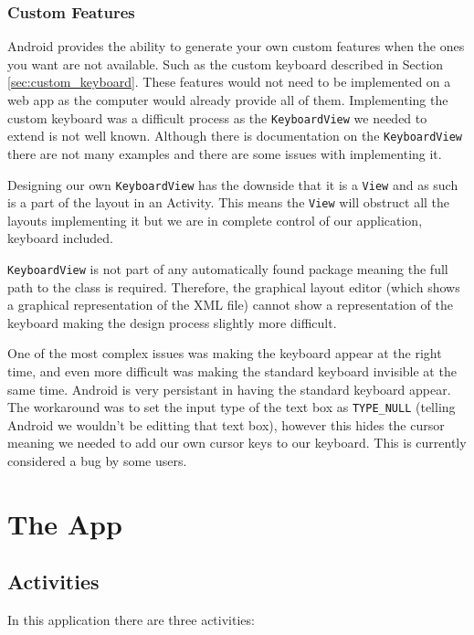\documentclass[draft]{report}
\begin{document}
\subsection{Custom Features}
\label{sub:custom_features}

Android provides the ability to generate your own custom features when the ones you want are not available. Such as the custom keyboard described in Section \ref{sec:custom_keyboard}. These features would not need to be implemented on a web app as the computer would already provide all of them. Implementing the custom keyboard was a difficult process as the {\tt KeyboardView} we needed to extend is not well known. Although there is documentation on the {\tt KeyboardView} there are not many examples and there are some issues with implementing it.

Designing our own {\tt KeyboardView} has the downside that it is a {\tt View} and as such is a part of the layout in an Activity. This means the {\tt View} will obstruct all the layouts implementing it but we are in complete control of our application, keyboard included.

{\tt KeyboardView} is not part of any automatically found package meaning the full path to the class is required. Therefore, the graphical layout editor (which shows a graphical representation of the XML file) cannot show a representation of the keyboard making the design process slightly more difficult.

One of the most complex issues was making the keyboard appear at the right time, and even more difficult was making the standard keyboard invisible at the same time. Android is very persistant in having the standard keyboard appear. The workaround was to set the input type of the text box as {\tt TYPE\_NULL} (telling Android we wouldn't be editting that text box), however this hides the cursor meaning we needed to add our own cursor keys to our keyboard. This is currently considered a bug by some users\cite{keyboardview}.

\chapter{The App}
\label{chap:the_app}

\section{Activities}

In this application there are three activities: 
\end{document}
